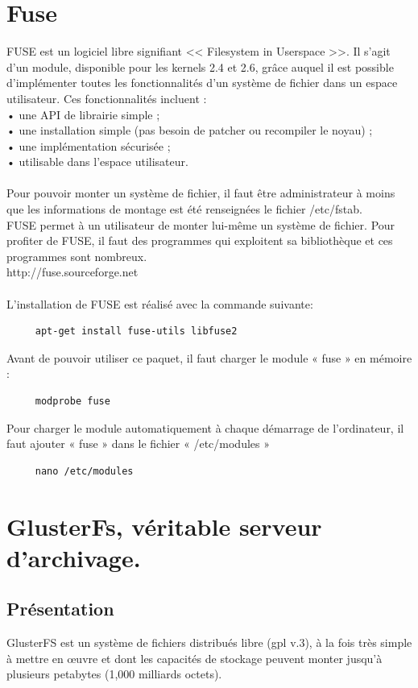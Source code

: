 \documentclass[12pt]{report}
\begin{document}
		\chapter{Fuse}
FUSE est un logiciel libre signifiant << Filesystem in Userspace >>. Il s'agit d'un module, disponible pour les kernels 2.4 et 2.6, grâce auquel il est possible d'implémenter toutes les fonctionnalités d'un système de fichier dans un espace utilisateur. Ces fonctionnalités incluent :\\
   • une API de librairie simple ;\\
   • une installation simple (pas besoin de patcher ou recompiler le noyau) ;\\
   • une implémentation sécurisée ;\\
   • utilisable dans l'espace utilisateur.\\\\
Pour pouvoir monter un système de fichier, il faut être administrateur à moins que les informations de montage est été renseignées le fichier /etc/fstab.\\
FUSE permet à un utilisateur de monter lui-même un système de fichier. Pour profiter de FUSE, il faut des programmes qui exploitent sa bibliothèque et ces programmes sont nombreux.\\
http://fuse.sourceforge.net\\\\
L'installation de FUSE est réalisé avec la commande suivante:\\
\begin{lstlisting}
	 apt-get install fuse-utils libfuse2
	 \end{lstlisting}
Avant de pouvoir utiliser ce paquet, il faut charger le module « fuse » en mémoire :\\
\begin{lstlisting}
	 modprobe fuse
	 \end{lstlisting}
Pour charger le module automatiquement à chaque démarrage de l’ordinateur, il faut ajouter « fuse » dans le fichier « /etc/modules »\\
\begin{lstlisting}
	 nano /etc/modules
	 \end{lstlisting}
	\chapter{GlusterFs, véritable serveur d'archivage.}
		\section{Présentation}
GlusterFS est un système de fichiers distribués libre (gpl v.3), à la fois très simple à mettre en œuvre et dont les capacités de stockage peuvent monter jusqu'à plusieurs petabytes (1,000 milliards octets).\\
\end{document}
